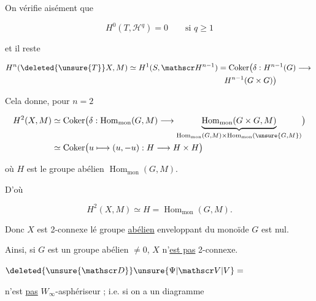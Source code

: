 
On vérifie aisément que

\[
 H^0(T,\mathscr H^q)=0\qquad\text{si }q\geq1
\]

et il reste

\[
 \begin{aligned}
 H^n(\deleted{\unsure{T}}X,M)&\simeq H^1(S,\mathscr H^{n-1})=\operatorname{Coker}\bigl(\delta:H^{n-1}(G)\longrightarrow{}\\
 &\hspace{12em}H^{n-1}(G\times G)\bigr)
 \end{aligned}
\]

Cela donne, pour $n=2$

\[
 \begin{aligned}
 H^2(X,M)&\simeq\operatorname{Coker}\bigl(\delta:\operatorname{Hom}_{\mathrm{mon}}(G,M)\longrightarrow
 \underbrace{\operatorname{Hom}_{\mathrm{mon}}(G\times G,M)}_{\operatorname{Hom}_{\mathrm{mon}}(G,M)\times\operatorname{Hom}_{\mathrm{mon}}(\unsure{G,M})}\bigr)\\
 &\simeq\operatorname{Coker}\bigl(u\longmapsto(u,-u):H\longrightarrow H\times H\bigr)
 \end{aligned}
\]

où $H$ est le groupe abélien $\operatorname{Hom}_{\mathrm{mon}}(G,M)$.

D'où

\[
 H^2(X,M)\simeq H=\operatorname{Hom}_{\mathrm{mon}}(G,M).
\]

Donc $X$ est 2-connexe  lé groupe \uline{abélien} enveloppant du monoïde $G$ est nul.

Ainsi, si $G$ est un groupe abélien $\ne0$, $X$ n'\uline{est pas} 2-connexe.

 \uline{} $\deleted{\unsure{\mathscr D}}\unsure{\Psi|\mathscr V|V}={}$


n'est \uline{pas}  $W_\infty$-asphériseur ; i.e. si on a un diagramme


